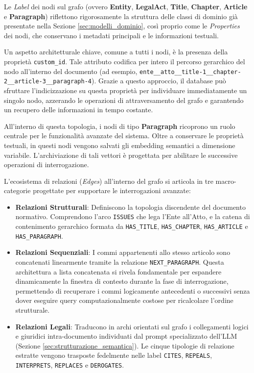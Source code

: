 Le \textit{Label} dei nodi sul grafo (ovvero \textbf{Entity}, \textbf{LegalAct}, \textbf{Title}, \textbf{Chapter}, \textbf{Article} e \textbf{Paragraph}) riflettono rigorosamente la struttura delle classi di dominio già presentate nella Sezione \ref{sec:modelli_dominio}, così proprio come le \textit{Properties} dei nodi, che conservano i metadati principali e le informazioni testuali.

Un aspetto architetturale chiave, comune a tutti i nodi, è la presenza della proprietà \texttt{custom\_id}. Tale attributo codifica per intero il percorso gerarchico del nodo all'interno del documento (ad esempio, \texttt{ente\_\_atto\_\_title-1\_\_chapter-2\_\_article-3\_\_paragraph-4}). Grazie a questo approccio, il database può sfruttare l'indicizzazione su questa proprietà per individuare immediatamente un singolo nodo, azzerando le operazioni di attraversamento del grafo e garantendo un recupero delle informazioni in tempo costante.

All'interno di questa topologia, i nodi di tipo \textbf{Paragraph} ricoprono un ruolo centrale per le funzionalità avanzate del sistema. Oltre a conservare le proprietà testuali, in questi nodi vengono salvati gli embedding semantici a dimensione variabile. L'archiviazione di tali vettori è progettata per abilitare le successive operazioni di interrogazione.

L'ecosistema di relazioni (\textit{Edges}) all'interno del grafo si articola in tre macro-categorie progettate per supportare le interrogazioni avanzate:
\begin{itemize}
    \item \textbf{Relazioni Strutturali}: Definiscono la topologia discendente del documento normativo. Comprendono l'arco \texttt{ISSUES} che lega l'Ente all'Atto, e la catena di contenimento gerarchico formata da \texttt{HAS\_TITLE}, \texttt{HAS\_CHAPTER}, \texttt{HAS\_ARTICLE} e \texttt{HAS\_PARAGRAPH}.
    \item \textbf{Relazioni Sequenziali}: I commi appartenenti allo stesso articolo sono concatenati linearmente tramite la relazione \texttt{NEXT\_PARAGRAPH}. Questa architettura a lista concatenata si rivela fondamentale per espandere dinamicamente la finestra di contesto durante la fase di interrogazione, permettendo di recuperare i commi logicamente antecedenti o successivi senza dover eseguire query computazionalmente costose per ricalcolare l'ordine strutturale.
    \item \textbf{Relazioni Legali}: Traducono in archi orientati sul grafo i collegamenti logici e giuridici intra-documento individuati dal prompt specializzato dell'LLM (Sezione \ref{sec:strutturazione_semantica}). Le cinque tipologie di relazione estratte vengono trasposte fedelmente nelle label \texttt{CITES}, \texttt{REPEALS}, \texttt{INTERPRETS}, \texttt{REPLACES} e \texttt{DEROGATES}. 
\end{itemize}

